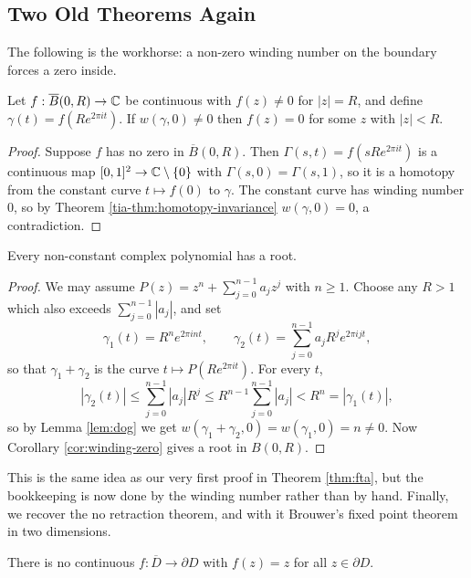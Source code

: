 \documentclass[a4paper]{scrartcl}
\newcommand{\dbar}{\overline{D}}
\begin{document}
\subsection{Two Old Theorems Again}

The following is the workhorse: a non-zero winding number on the boundary forces a zero inside.

\begin{corollary}\label{cor:winding-zero}
	Let $f : \overline{B}(0,R)\to\mathbb{C}$ be continuous with $f(z)\neq0$ for $|z|=R$, and define $\gamma(t) = f(Re^{2\pi it})$. If $w(\gamma,0)\neq0$ then $f(z)=0$ for some $z$ with $|z|<R$.
\end{corollary}

\begin{proof}
	Suppose $f$ has no zero in $\overline B(0,R)$. Then $\Gamma(s,t) = f(sRe^{2\pi it})$ is a continuous map $[0,1]^2\to\mathbb{C}\setminus\{0\}$ with $\Gamma(s,0)=\Gamma(s,1)$, so it is a homotopy from the constant curve $t\mapsto f(0)$ to $\gamma$. The constant curve has winding number $0$, so by Theorem \ref{tia-thm:homotopy-invariance} $w(\gamma,0)=0$, a contradiction.
\end{proof}

\begin{theorem}
	Every non-constant complex polynomial has a root.
\end{theorem}

\begin{proof}
	We may assume $P(z) = z^n + \sum_{j=0}^{n-1}a_jz^j$ with $n\geq1$. Choose any $R>1$ which also exceeds $\sum_{j=0}^{n-1}|a_j|$, and set
	$$\gamma_1(t) = R^ne^{2\pi int}, \qquad \gamma_2(t) = \sum_{j=0}^{n-1}a_jR^je^{2\pi ijt},$$
	so that $\gamma_1+\gamma_2$ is the curve $t\mapsto P(Re^{2\pi it})$. For every $t$,
	$$|\gamma_2(t)|\leq\sum_{j=0}^{n-1}|a_j|R^j \leq R^{n-1}\sum_{j=0}^{n-1}|a_j| < R^n = |\gamma_1(t)|,$$
	so by Lemma \ref{lem:dog} we get $w(\gamma_1+\gamma_2,0)=w(\gamma_1,0)=n\neq0$. Now Corollary \ref{cor:winding-zero} gives a root in $B(0,R)$.
\end{proof}

This is the same idea as our very first proof in Theorem \ref{thm:fta}, but the bookkeeping is now done by the winding number rather than by hand. Finally, we recover the no retraction theorem, and with it Brouwer's fixed point theorem in two dimensions.

\begin{theorem}
	There is no continuous $f : \dbar\to\partial D$ with $f(z)=z$ for all $z\in\partial D$.
\end{theorem}
\end{document}
